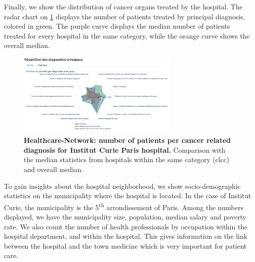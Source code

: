 Finally, we show the distribution of cancer organs treated by the hospital. The radar chart on \cref{fig:hn-curie-dp} displays the number of patients treated by principal diagnosis, colored in green. The purple curve displays the median number of patients treated for every hospital in the same category, while the orange curve shows the overall median.

\begin{figure}[H]
    \includegraphics[width=0.7\textwidth]{images/healthcare-network/curie-dp.png}
    \centering
    \caption{
        \textbf{Healthcare-Network: number of patients per cancer related diagnosis for Institut Curie Paris hospital.} Comparison with the median statistics from hospitals within the same category (\ac{clcc}) and overall median.
    }
    \label{fig:hn-curie-dp}
\end{figure}

To gain insights about the hospital neighborhood, we show socio-demographic statistics on the municipality where the hospital is located. In the case of Institut Curie, the municipality is the 5\textsuperscript{th} arrondissement of Paris. Among the numbers displayed, we have the municipality size, population, median salary and poverty rate. We also count the number of health professionals by occupation within the hospital department, and within the hospital. This gives information on the link between the hospital and the town medicine which is very important for patient care.

